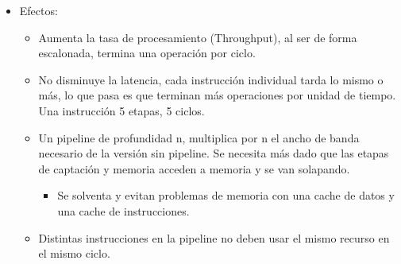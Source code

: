 \documentclass[12pt, twoside, openright]{report} %
\begin{document}
  \begin{itemize}
  
  \item
    Efectos:

    \begin{itemize}
    
    \item
      Aumenta la tasa de procesamiento (Throughput), al ser de forma
      escalonada, termina una operación por ciclo.
    \item
      No disminuye la latencia, cada instrucción individual tarda lo
      mismo o más, lo que pasa es que terminan más operaciones por
      unidad de tiempo. Una instrucción 5 etapas, 5 ciclos.
    \item
      Un pipeline de profundidad n, multiplica por n el ancho de banda
      necesario de la versión sin pipeline. Se necesita más dado que las
      etapas de captación y memoria acceden a memoria y se van
      solapando.

      \begin{itemize}
      
      \item
        Se solventa y evitan problemas de memoria con una cache de datos
        y una cache de instrucciones.
      \end{itemize}
    \item
      Distintas instrucciones en la pipeline no deben usar el mismo
      recurso en el mismo ciclo.

      \begin{itemize}
      

\end{itemize}
\end{itemize}
\end{itemize}
\end{document}
